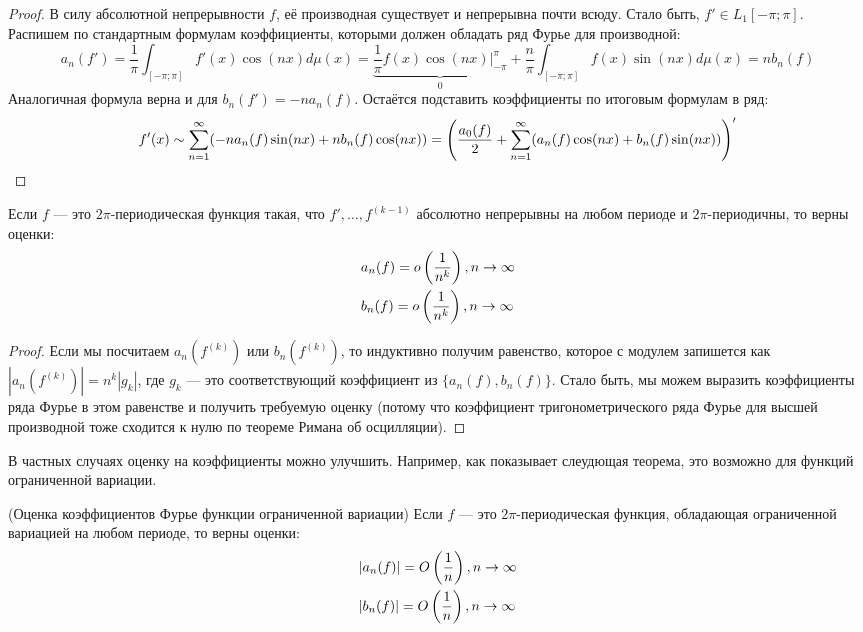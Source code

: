 \begin{proof}
	В силу абсолютной непрерывности $f$, её производная существует и непрерывна почти всюду. Стало быть, $f' \in L_1[-\pi; \pi]$. Распишем по стандартным формулам коэффициенты, которыми должен обладать ряд Фурье для производной:
	\[
		a_n(f') = \frac{1}{\pi} \int_{[-\pi; \pi]} f'(x)\cos(nx)d\mu(x) = \underbrace{\frac{1}{\pi} f(x)\cos(nx)\Big|_{-\pi}^\pi}_{0} + \frac{n}{\pi} \int_{[-\pi; \pi]} f(x)\sin(nx)d\mu(x) = nb_n(f)
	\]
	Аналогичная формула верна и для $b_n(f') = -na_n(f)$. Остаётся подставить коэффициенты по итоговым формулам в ряд:
	\[
		f'(x) \sim \sum_{n = 1}^\infty (-na_n(f)\sin(nx) + nb_n(f)\cos(nx)) = \left(\frac{a_0(f)}{2} + \sum_{n = 1}^\infty (a_n(f)\cos(nx) + b_n(f)\sin(nx))\right)'
	\]
\end{proof}

\begin{corollary}
	Если $f$ --- это $2\pi$-периодическая функция такая, что $f', \ldots, f^{(k - 1)}$ абсолютно непрерывны на любом периоде и $2\pi$-периодичны, то верны оценки:
	\begin{align*}
		&{a_n(f) = o\left(\frac{1}{n^k}\right), n \to \infty}
		\\
		&{b_n(f) = o\left(\frac{1}{n^k}\right), n \to \infty}
	\end{align*}
\end{corollary}

\begin{proof}
	Если мы посчитаем $a_n(f^{(k)})$ или $b_n(f^{(k)})$, то индуктивно получим равенство, которое с модулем запишется как \(|a_n(f^{(k)})| = n^k|g_k|\), где $g_k$ --- это соответствующий коэффициент из $\{a_n(f), b_n(f)\}$. Стало быть, мы можем выразить коэффициенты ряда Фурье в этом равенстве и получить требуемую оценку (потому что коэффициент тригонометрического ряда Фурье для высшей производной тоже сходится к нулю по теореме Римана об осцилляции).
\end{proof}

\begin{note}
	В частных случаях оценку на коэффициенты можно улучшить. Например, как показывает слеудющая теорема, это возможно для функций ограниченной вариации.
\end{note}

\begin{theorem} (Оценка коэффициентов Фурье функции ограниченной вариации)
	Если $f$ --- это $2\pi$-периодическая функция, обладающая ограниченной вариацией на любом периоде, то верны оценки:
	\begin{align*}
		&{|a_n(f)| = O\left(\frac{1}{n}\right), n \to \infty}
		\\
		&{|b_n(f)| = O\left(\frac{1}{n}\right), n \to \infty}
	\end{align*}
\end{theorem}

